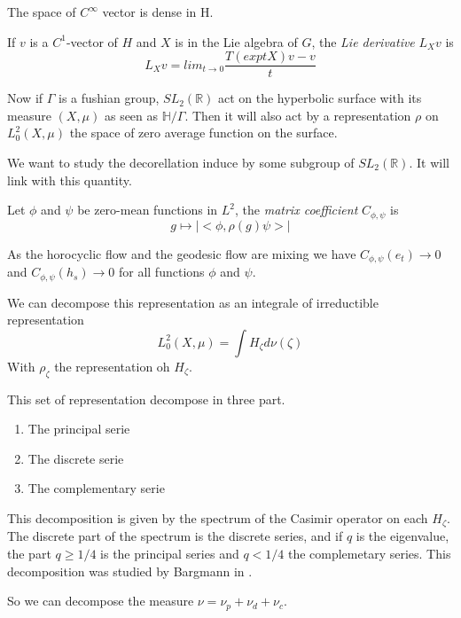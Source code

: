 \begin{rmq}
The space of $C^{\infty}$ vector is dense in H.
\end{rmq}

\begin{dfnt}
If $v$ is a $C^1$-vector of $H$ and $X$ is in the Lie algebra of $G$, the \emph{Lie derivative} $L_X v$ is \[
L_X v =lim_{t \to 0} \frac{T(exp tX)v-v}{t}
\]
\end{dfnt}

Now if $\Gamma$ is a fushian group, $SL_2(\mathbb{R})$ act on the hyperbolic surface with its measure $(X,\mu)$ as seen as $\mathbb{H}/ \Gamma$.
Then it will also act by a representation $\rho$ on $L^2_0(X,\mu)$ the space of zero average function on the surface.

We want to study the decorellation induce by some subgroup of $SL_2(\mathbb{R})$. It will link with this quantity.

\begin{dfnt}
Let $\phi$ and $\psi$ be zero-mean functions in $L^2$, the \emph{matrix coefficient} $C_{\phi,\psi}$ is\[
g \mapsto |<\phi, \rho(g) \psi>|
\]
\end{dfnt}

\begin{rmq}
As the horocyclic flow and the geodesic flow are mixing we have $C_{\phi,\psi}(e_t) \to 0$ and $C_{\phi,\psi}(h_s) \to 0$ for all functions $\phi$ and $\psi$.
\end{rmq}

We can decompose this representation as an integrale of irreductible representation \[
L^2_0(X,\mu)=\int H_\zeta d \nu(\zeta)
\]
With $\rho_{\zeta}$ the representation oh $H_{\zeta}$.

This set of representation decompose in three part. \begin{enumerate}
\item The principal serie
\item The discrete serie
\item The complementary serie
\end{enumerate}

This decomposition is given by the spectrum of the Casimir operator on each $H_\zeta$.
The discrete part of the spectrum is the discrete series, and if $q$ is the eigenvalue, the part $q \geq 1/4$ is the principal series and $q < 1/4$ the complemetary series. This decomposition was studied by Bargmann in \cite{10.2307/1969129}.

So we can decompose the measure $\nu=\nu_p + \nu_d + \nu_c$.

